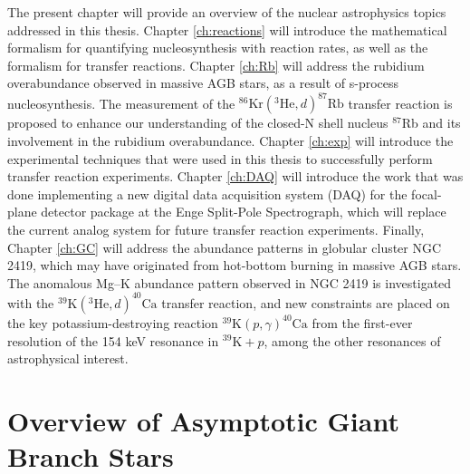 The present chapter will provide an overview of the nuclear astrophysics topics addressed in this thesis. Chapter \ref{ch:reactions} will introduce the mathematical formalism for quantifying nucleosynthesis with reaction rates, as well as the formalism for transfer reactions. Chapter \ref{ch:Rb} will address the rubidium overabundance observed in massive AGB stars, as a result of s-process nucleosynthesis. The measurement of the $^{86}\mathrm{Kr}(^{3}\mathrm{He},d)^{87}\mathrm{Rb}$ transfer reaction is proposed to enhance our understanding of the closed-N shell nucleus $^{87}$Rb and its involvement in the rubidium overabundance. Chapter \ref{ch:exp} will introduce the experimental techniques that were used in this thesis to successfully perform transfer reaction experiments. Chapter \ref{ch:DAQ} will introduce the work that was done implementing a new digital data acquisition system (DAQ) for the focal-plane detector package at the Enge Split-Pole Spectrograph, which will replace the current analog system for future transfer reaction experiments. Finally, Chapter \ref{ch:GC} will address the abundance patterns in globular cluster NGC 2419, which may have originated from hot-bottom burning in massive AGB stars. The anomalous Mg--K abundance pattern observed in NGC 2419 is investigated with the $^{39}\mathrm{K}(^{3}\mathrm{He},d)^{40}\mathrm{Ca}$ transfer reaction, and new constraints are placed on the key potassium-destroying reaction $^{39}\mathrm{K}(p,\gamma)^{40}\mathrm{Ca}$ from the first-ever resolution of the 154 keV resonance in $^{39}\mathrm{K}+p$, among the other resonances of astrophysical interest.

\section{Overview of Asymptotic Giant Branch Stars}

